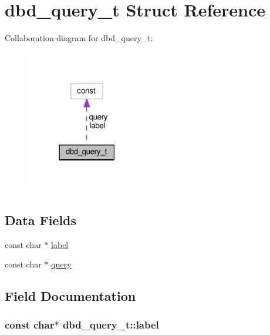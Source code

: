 \hypertarget{structdbd__query__t}{}\section{dbd\+\_\+query\+\_\+t Struct Reference}
\label{structdbd__query__t}


Collaboration diagram for dbd\+\_\+query\+\_\+t\+:
\nopagebreak
\begin{figure}[H]
\begin{center}
\leavevmode
\includegraphics[width=150pt]{structdbd__query__t__coll__graph}
\end{center}
\end{figure}
\subsection*{Data Fields}
\begin{DoxyCompactItemize}
\item 
const char $\ast$ \hyperlink{structdbd__query__t_a65b86c1ade3176dbb9c5f034a7ae6e8e}{label}
\item 
const char $\ast$ \hyperlink{structdbd__query__t_ab78402fbd13747096b8a758cbf63b232}{query}
\end{DoxyCompactItemize}


\subsection{Field Documentation}
\subsubsection[{\texorpdfstring{label}{label}}]{\setlength{\rightskip}{0pt plus 5cm}const char$\ast$ dbd\+\_\+query\+\_\+t\+::label}\hypertarget{structdbd__query__t_a65b86c1ade3176dbb9c5f034a7ae6e8e}{}\label{structdbd__query__t_a65b86c1ade3176dbb9c5f034a7ae6e8e}
